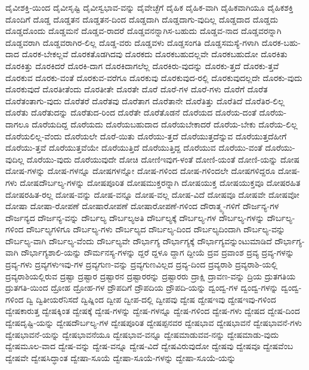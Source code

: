 {ದೈವೀಶಕ್ತಿ-ಯಿಂದ
ದೈವೀಸೃಷ್ಟಿ
ದೈವೀಸ್ವಭಾವ-ವನ್ನು
ದೈವೇಚ್ಛೆಗೆ
ದೈಹಿಕ
ದೈಹಿಕ-ವಾಗಿ
ದೈಹಿಕವಾಗಿಯೂ
ದೈಹಿಕಶಕ್ತಿ
ದೊಂದಿಗೆ
ದೊಡ್ಡ
ದೊಡ್ಡತನ
ದೊಡ್ಡತನ-ದಿಂದ
ದೊಡ್ಡದಾಗಿ
ದೊಡ್ಡದಾಗು-ವುದಿಲ್ಲ
ದೊಡ್ಡದಾದ
ದೊಡ್ಡದು
ದೊಡ್ಡದೊಂದು
ದೊಡ್ಡಮನೆ
ದೊಡ್ಡವ-ರಾದರೆ
ದೊಡ್ಡವನನ್ನಾಗಿಸ-ಬಹುದು
ದೊಡ್ಡವ-ನಾದ
ದೊಡ್ಡವರನ್ನಾಗಿ
ದೊಡ್ಡವರಾಗಿ
ದೊಡ್ಡವರಾಗಿರ-ಲಿಲ್ಲ
ದೊಡ್ಡ-ವರು
ದೊಡ್ಡವಳು
ದೊಡ್ಡಸಂಗತಿ
ದೊಡ್ಡಸಮಸ್ಯೆ-ಗಳಾಗಿ
ದೊರಕ-ಬಹು-ದಾದ
ದೊರಕ-ಬೇಕಲ್ಲವೆ
ದೊರಕತೊಡಗಿದವು
ದೊರಕದು
ದೊರಕಬಹುದಲ್ಲವೇ
ದೊರಕಬಹುದೋ
ದೊರಕಿತು
ದೊರಕಿತ್ತು
ದೊರಕಿದರೆ
ದೊರಕಿ-ದಾಗ
ದೊರಕಿದಾಗಲೆಲ್ಲ
ದೊರಕಿರು-ವುದನ್ನು
ದೊರಕು-ತ್ತದೆ
ದೊರಕು-ತ್ತವೆ
ದೊರಕುವ
ದೊರಕು-ವಂತೆ
ದೊರಕುವ-ವರೆಗೂ
ದೊರಕುವು
ದೊರಕುವುದ-ರಲ್ಲಿ
ದೊರಕುವುದಲ್ಲದೇ
ದೊರಕು-ವುದು
ದೊರಕುವುದೆ
ದೊರತೀತೆಂದು
ದೊರತೀತೇ
ದೊರತೇ
ದೊರೆ
ದೊರೆ-ಗಳ
ದೊರೆ-ಗಳು
ದೊರೆಗೆ
ದೊರೆತ
ದೊರೆತಂತಾಗು-ವುದು
ದೊರೆತರೆ
ದೊರೆತವು
ದೊರೆತಾಗ
ದೊರೆತಾನೇ
ದೊರೆತಿತ್ತು
ದೊರೆತಿದೆ
ದೊರೆತಿರ-ಲಿಲ್ಲ
ದೊರೆತು
ದೊರೆತುದನ್ನು
ದೊರೆತುದ-ರಿಂದ
ದೊರೆತೇ
ದೊರೆತೊಡನೆ
ದೊರೆಯದ
ದೊರೆಯ-ದಂತೆ
ದೊರೆಯ-ದಾಗಲೂ
ದೊರೆಯದಿದ್ದ
ದೊರೆಯದು
ದೊರೆಯಬಹುದಾದ
ದೊರೆಯಬೇಕಾದರೆ
ದೊರೆಯ-ಬೇಕು
ದೊರೆಯ-ಲಿಲ್ಲ
ದೊರೆಯಲಿಲ್ಲ-ವೆಂದು
ದೊರೆಯಲೇ
ದೊರೆ-ಯಿತು
ದೊರೆಯು-ತ್ತದೆ
ದೊರೆಯುತ್ತದೆನ್ನುವ
ದೊರೆಯುತ್ತದೆಹೀಗೆ
ದೊರೆಯು-ತ್ತವೆ
ದೊರೆಯುತ್ತವೆಯೇ
ದೊರೆಯುತ್ತಿದೆ
ದೊರೆಯುತ್ತಿದ್ದ
ದೊರೆಯುವ
ದೊರೆಯು-ವಂತೆ
ದೊರೆಯು-ವುದಿಲ್ಲ
ದೊರೆಯು-ವುದು
ದೊರೆಯುವುದೇ
ದೋಚಿ
ದೋಣಿಇವುಗ-ಳಂತೆ
ದೋಣಿ-ಯಂತೆ
ದೋಣಿ-ಯನ್ನು
ದೋಷ
ದೋಷ-ಗಳನ್ನು
ದೋಷ-ಗಳನ್ನೂ
ದೋಷಗಳನ್ನೋ
ದೋಷ-ಗಳಿಂದ
ದೋಷ-ಗಳಿಂದಲೇ
ದೋಷಗಳಿದ್ದರೂ
ದೋಷ-ಗಳು
ದೋಷದೌರ್ಬಲ್ಯ-ಗಳನ್ನು
ದೋಷಪೂರಿತ
ದೋಷಮುಕ್ತರನ್ನಾಗಿ
ದೋಷಯುಕ್ತ
ದೋಷಯುಕ್ತವೂ
ದೋಷರಹಿತ
ದೋಷರಹಿತ-ರಲ್ಲ
ದೋಷ-ವನ್ನು
ದೋಷ-ವನ್ನೂ
ದೋಷ-ವಲ್ಲ
ದೋಷ-ವಿದೆ
ದೋಷವೂ
ದೋಷವೇ
ದೋಷವೋ
ದೋಷಾ
ದೋಷಾ-ರೋಪಣೆ
ದೋಷಾರೋಪಣೆ
ದೋಷಾರೋಪಣೆ-ಗಳಿಂದ
ದೌರಾತ್ಮ್ಯ-ಗಳಿಗೆ
ದೌರ್ಜನ್ಯ-ಗಳ
ದೌರ್ಜನ್ಯದ
ದೌರ್ಜನ್ಯ-ವನ್ನು
ದೌರ್ಬಲ್ಯ
ದೌರ್ಬಲ್ಯಅತಿ
ದೌರ್ಬಲ್ಯಕ್ಕೆ
ದೌರ್ಬಲ್ಯ-ಗಳ
ದೌರ್ಬಲ್ಯ-ಗಳನ್ನು
ದೌರ್ಬಲ್ಯ-ಗಳಿಂದ
ದೌರ್ಬಲ್ಯಗಳಿಗೂ
ದೌರ್ಬಲ್ಯ-ಗಳು
ದೌರ್ಬಲ್ಯದ
ದೌರ್ಬಲ್ಯ-ದಿಂದ
ದೌರ್ಬಲ್ಯದಿಂದಾಗಿ
ದೌರ್ಬಲ್ಯ-ವನ್ನು
ದೌರ್ಬಲ್ಯ-ವಾಗಿ
ದೌರ್ಬಲ್ಯ-ವೆಂದು
ದೌರ್ಬಲ್ಯವೇ
ದೌರ್ಭಾಗ್ಯ
ದೌರ್ಭಾಗ್ಯಕ್ಕೆ
ದೌರ್ಭಾಗ್ಯವನ್ನುಂಟುಮಾಡಿದೆ
ದೌರ್ಭಾಗ್ಯ-ವಾಗಿ
ದೌರ್ಭಾಗ್ಯಶಾಲಿ-ಯನ್ನು
ದೌರ್ಮನಸ್ಯ-ಗಳನ್ನು
ದ್ದರೆ
ದ್ದಳೂ
ದ್ದಾಗ
ದ್ದೀಯೆ
ದ್ರವ
ದ್ರವಾಂಶ
ದ್ರವ್ಯ
ದ್ರವ್ಯ-ಗಳನ್ನು
ದ್ರವ್ಯ-ಗಳು
ದ್ರವ್ಯಗಳುಇವು-ಗಳ
ದ್ರವ್ಯಗುಣ-ವನ್ನು
ದ್ರವ್ಯಗುಣವಿಲ್ಲದ
ದ್ರವ್ಯ-ದಿಂದ
ದ್ರವ್ಯರಾಶಿ
ದ್ರವ್ಯರಾಶಿ-ಯಲ್ಲಿ
ದ್ರವ್ಯರಾಶಿಯಲ್ಲಿರುವ
ದ್ರಷ್ಟಾ
ದ್ರಷ್ಟಾರ
ದ್ರಷ್ಟಾರನ
ದ್ರಷ್ಟಾರರನ್ನು
ದ್ರಷ್ಟಾರರು
ದ್ರಾಕ್ಷಿ
ದ್ರಾವಣ-ವನ್ನು
ದ್ರಿಯ
ದ್ರುತಗತಿಯ
ದ್ರುತಗತಿ-ಯಿಂದ
ದ್ರೋಹ
ದ್ರೋಹ-ಗಳ
ದ್ರೌಪದಿಗೆ
ದ್ರೌಪದಿಯ
ದ್ರೌಪದಿ-ಯನ್ನು
ದ್ವಂದ್ವ-ಗಳ
ದ್ವಂದ್ವ-ಗಳನ್ನು
ದ್ವಂದ್ವ-ಗಳಿಂದ
ದ್ವಿ
ದ್ವಿತೀಯರೆನಿಸದೆ
ದ್ವಿಷ್ನಿಂದ
ದ್ವೀಪ
ದ್ವೀಪ-ದಲ್ಲಿ
ದ್ವೀಪವು
ದ್ವೇಷ
ದ್ವೇಷಇವು
ದ್ವೇಷಇವು-ಗಳಿಂದ
ದ್ವೇಷಕಾರುತ್ತ
ದ್ವೇಷಕ್ಕಿಂತ
ದ್ವೇಷಕ್ಕೆ
ದ್ವೇಷ-ಗಳನ್ನು
ದ್ವೇಷ-ಗಳನ್ನೂ
ದ್ವೇಷ-ಗಳಿಂದ
ದ್ವೇಷ-ಗಳು
ದ್ವೇಷದ
ದ್ವೇಷ-ದಿಂದ
ದ್ವೇಷದೃಷ್ಟಿ-ಯನ್ನು
ದ್ವೇಷದೌರ್ಬಲ್ಯ-ಗಳ
ದ್ವೇಷಪೂರಿತ
ದ್ವೇಷಪ್ಪನವರ
ದ್ವೇಷಭಾವ
ದ್ವೇಷಭಾವನೆ
ದ್ವೇಷಭಾವನೆ-ಗಳು
ದ್ವೇಷಭಾವನೆ-ಯನ್ನು
ದ್ವೇಷಭಾವನೆಯೂ
ದ್ವೇಷಭಾವ-ವನ್ನೂ
ದ್ವೇಷಮಾಡುವವ-ನನ್ನು
ದ್ವೇಷಮಾಡು-ವುದು
ದ್ವೇಷಮೂಲ-ವಾದ
ದ್ವೇಷ-ವನ್ನು
ದ್ವೇಷ-ವನ್ನೂ
ದ್ವೇಷ-ವಿದೆ
ದ್ವೇಷವಿರುವುದೋ
ದ್ವೇಷವು
ದ್ವೇಷವೂ
ದ್ವೇಷವೆಂಬ
ದ್ವೇಷವೇ
ದ್ವೇಷಸಿದ್ಧಾಂತ
ದ್ವೇಷಾ-ಸೂಯೆ
ದ್ವೇಷಾ-ಸೂಯೆ-ಗಳನ್ನು
ದ್ವೇಷಾ-ಸೂಯೆ-ಯನ್ನು
}
